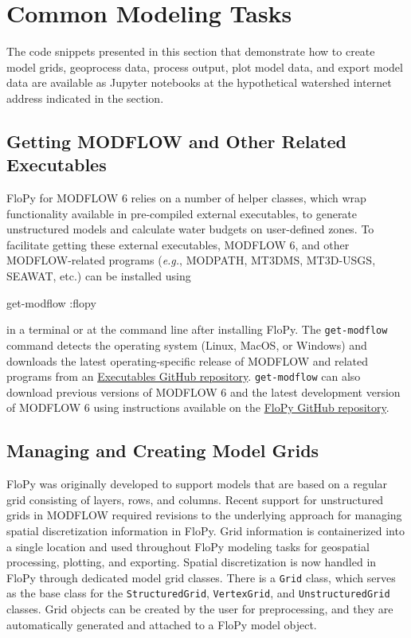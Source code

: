 \documentclass[12pt, oneside]{article}  	%
\begin{document}
\section*{Common Modeling Tasks}

The code snippets presented in this section that demonstrate how to create model grids, geoprocess data, process output, plot model data, and export model data are available as Jupyter notebooks \citep{Kluyver:2016aa} at the hypothetical watershed internet address indicated in the  section.

\subsection*{Getting MODFLOW and Other Related Executables}

FloPy for MODFLOW 6 relies on a number of helper classes, which wrap functionality available in pre-compiled external executables, to generate unstructured models and calculate water budgets on user-defined zones. To facilitate getting these external executables, MODFLOW 6, and other MODFLOW-related programs (\textit{e.g.}, MODPATH, MT3DMS, MT3D-USGS, SEAWAT, etc.) can be installed using

\begin{terminal}
get-modflow :flopy
\end{terminal}

\noindent in a terminal or at the command line after installing FloPy. The \texttt{get-modflow} command detects the operating system (Linux, MacOS, or Windows) and downloads the latest operating-specific release of MODFLOW and related programs from an \href{https://github.com/MODFLOW-USGS/executables}{Executables GitHub repository}. \texttt{get-modflow} can also download previous versions of MODFLOW 6 and the latest development version of MODFLOW 6 using instructions available on the \href{https://github.com/modflowpy/flopy/blob/develop/docs/get_modflow.md}{FloPy GitHub repository}.

\subsection*{Managing and Creating Model Grids}

FloPy was originally developed to support models that are based on a regular grid consisting of layers, rows, and columns. Recent support for unstructured grids in MODFLOW \citep{modflowusg, modflow6gwf} required revisions to the underlying approach for managing spatial discretization information in FloPy. Grid information is containerized into a single location and used throughout FloPy modeling tasks for geospatial processing, plotting, and exporting. Spatial discretization is now handled in FloPy through dedicated model grid classes. There is a \texttt{Grid} class, which serves as the base class for the \texttt{StructuredGrid}, \texttt{VertexGrid}, and \texttt{UnstructuredGrid} classes. Grid objects can be created by the user for preprocessing, and they are automatically generated and attached to a FloPy model object.
\end{document}

